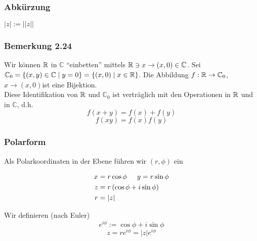 \subsubsection*{Abkürzung}
$\left| z\right| := \left|\left| z \right|\right|$
\subsubsection*{Bemerkung 2.24}
Wir können $\mathbb{R}$ in $\mathbb{C}$ ``einbetten'' mittels $\mathbb{R}\ni x\to (x,0)\in\mathbb{C}$. Sei $\mathbb{C}_0=\{ (x,y)\in\mathbb{C}\mid y=0 \}=\{ (x,0)\mid x\in\mathbb{R}\}$. Die Abbildung $f:\mathbb{R}\to\mathbb{C}_0$, $x\to (x,0)$ist eine Bijektion.\\

Diese Identifikation von $\mathbb{R}$ und $\mathbb{C}_0$ ist verträglich mit den Operationen in $\mathbb{R}$ und in $\mathbb{C}$, d.h.
\[f(x+y)=f(x)+f(y)\]
\[f(xy)=f(x)f(y)\]
\subsubsection*{Polarform}
Als Polarkoordinaten in der Ebene führen wir $(r,\phi)$ ein

\begin{multicols}{2}
\begin{center}
\end{center}
\columnbreak
\vfill
\begin{align*}
x&=r\cos\phi\hspace{5mm} y=r\sin\phi\\
z&=r\left( \cos\phi + i\sin\phi\right)\\
r&=\left| z\right|
\end{align*}
\null\vfill
\end{multicols}


\begin{definition}{}
Wir definieren (nach Euler)\[e^{i\phi}:=\cos\phi+ i\sin\phi\]\[z=re^{i\phi}=\left| z\right|e^{i\phi}\]
\end{definition}

